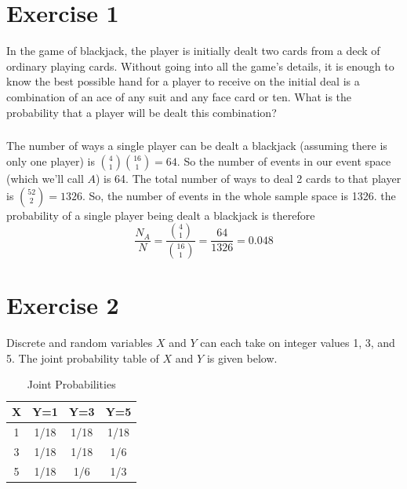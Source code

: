 \documentclass[11pt]{article}
\begin{document}
\thispagestyle{empty}

\newlength{\boxlength}\setlength{\boxlength}{\textwidth}
\addtolength{\boxlength}{-4mm}

\begin{center}
\end{center}

\section*{Exercise 1}
In the game of blackjack, the player is initially dealt two cards from a deck of ordinary playing cards. Without going into all the game's details, it is enough to know the best possible hand for a player to receive on the initial deal is a combination of an ace of any suit and any face card or ten. What is the probability that a player will be dealt this combination?

\subparagraph*{}
The number of ways a single player can be dealt a blackjack (assuming there is only one player) is ${4\choose1}{16\choose1} = 64$. So the number of events in our event space (which we'll call $A$) is 64. The total number of ways to deal 2 cards to that player is ${52\choose2} = 1326$. So, the number of events in the whole sample space is 1326. the probability of a single player being dealt a blackjack is therefore
\begin{equation*}
	\frac{N_A}{N} = \frac{{4\choose1}}{{16\choose1}} = \frac{64}{1326} = 0.048
\end{equation*}

\section*{Exercise 2}
Discrete and random variables $X$ and $Y$ can each take on integer values 1, 3, and 5. The joint probability table of $X$ and $Y$ is given below.

\begin{table}[h!]
  \begin{center}
    \caption{Joint Probabilities}
    \label{tab:table1}
    \begin{tabular}{c|c|c|c} %
      X & Y=1 & Y=3 & Y=5\\
      \hline
      1 & 1/18 & 1/18 & 1/18 \\
      3 & 1/18 & 1/18 & 1/6 \\
      5 & 1/18 & 1/6 & 1/3\\
    \end{tabular}
  \end{center}
\end{table}
\end{document}

